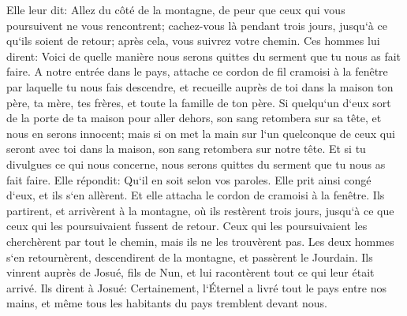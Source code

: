 \verse Elle leur dit: Allez du côté de la montagne, de peur que ceux qui vous poursuivent ne vous rencontrent; cachez-vous là pendant trois jours, jusqu`à ce qu`ils soient de retour; après cela, vous suivrez votre chemin. 
\verse Ces hommes lui dirent: Voici de quelle manière nous serons quittes du serment que tu nous as fait faire. 
\verse A notre entrée dans le pays, attache ce cordon de fil cramoisi à la fenêtre par laquelle tu nous fais descendre, et recueille auprès de toi dans la maison ton père, ta mère, tes frères, et toute la famille de ton père. 
\verse Si quelqu`un d`eux sort de la porte de ta maison pour aller dehors, son sang retombera sur sa tête, et nous en serons innocent; mais si on met la main sur l`un quelconque de ceux qui seront avec toi dans la maison, son sang retombera sur notre tête. 
\verse Et si tu divulgues ce qui nous concerne, nous serons quittes du serment que tu nous as fait faire. 
\verse Elle répondit: Qu`il en soit selon vos paroles. Elle prit ainsi congé d`eux, et ils s`en allèrent. Et elle attacha le cordon de cramoisi à la fenêtre. 
\verse Ils partirent, et arrivèrent à la montagne, où ils restèrent trois jours, jusqu`à ce que ceux qui les poursuivaient fussent de retour. Ceux qui les poursuivaient les cherchèrent par tout le chemin, mais ils ne les trouvèrent pas. 
\verse Les deux hommes s`en retournèrent, descendirent de la montagne, et passèrent le Jourdain. Ils vinrent auprès de Josué, fils de Nun, et lui racontèrent tout ce qui leur était arrivé. 
\verse Ils dirent à Josué: Certainement, l`Éternel a livré tout le pays entre nos mains, et même tous les habitants du pays tremblent devant nous. 

